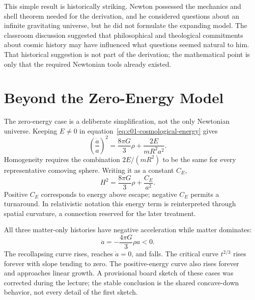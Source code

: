 This simple result is historically striking. Newton possessed the mechanics and shell theorem needed for the derivation, and he considered questions about an infinite gravitating universe, but he did not formulate the expanding model. The classroom discussion suggested that philosophical and theological commitments about cosmic history may have influenced what questions seemed natural to him. That historical suggestion is not part of the derivation; the mathematical point is only that the required Newtonian tools already existed.

\begin{classroomqa}
\end{classroomqa}

\section{Beyond the Zero-Energy Model}

The zero-energy case is a deliberate simplification, not the only Newtonian universe. Keeping \(E\neq0\) in equation~\eqref{eq:c01-cosmological-energy} gives
\begin{equation}
\left(\frac{\dot a}{a}\right)^2
=\frac{8\pi G}{3}\rho+\frac{2E}{mR^2a^2}.
\label{eq:c01-nonzero-energy}
\end{equation}
Homogeneity requires the combination \(2E/(mR^2)\) to be the same for every representative comoving sphere. Writing it as a constant \(C_E\),
\begin{equation}
H^2=\frac{8\pi G}{3}\rho+\frac{C_E}{a^2}.
\end{equation}
Positive \(C_E\) corresponds to energy above escape; negative \(C_E\) permits a turnaround. In relativistic notation this energy term is reinterpreted through spatial curvature, a connection reserved for the later treatment.

All three matter-only histories have negative acceleration while matter dominates:
\begin{equation}
\ddot a=-\frac{4\pi G}{3}\rho a<0.
\end{equation}
The recollapsing curve rises, reaches \(\dot a=0\), and falls. The critical curve \(t^{2/3}\) rises forever with slope tending to zero. The positive-energy curve also rises forever and approaches linear growth. A provisional board sketch of these cases was corrected during the lecture; the stable conclusion is the shared concave-down behavior, not every detail of the first sketch.

